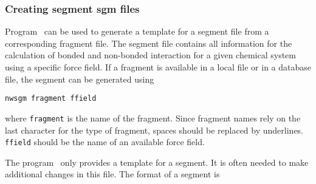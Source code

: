 \subsubsection{Creating segment {\bf sgm} files}
\label{nwsgm}
Program \nwsgm\ can be used to generate a template for a segment file 
from a corresponding fragment file. The segment file contains all
information for the calculation of bonded and non-bonded interaction
for a given chemical system using a specific force field. If a
fragment is available in a local file or in a database file, the
segment can be generated using
\begin{verbatim}
nwsgm fragment ffield
\end{verbatim}
where \verb+fragment+ is the name of the fragment. Since fragment
names rely on the last character for the type of fragment, spaces
should be replaced by underlines. \verb+ffield+ should be the
name of an available force field.
\par
The program \nwsgm\ only provides a template for a segment. It is
often needed to make additional changes in this file. The format
of a segment is
